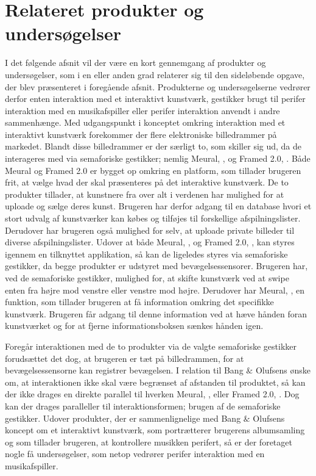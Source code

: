 \section{Relateret produkter og undersøgelser}
\label{RelateretProdukterOgUndersoegelser}
%
I det følgende afsnit vil der være en kort gennemgang af produkter og undersøgelser, som i en eller anden grad relaterer sig til den sideløbende opgave, der blev præsenteret i foregående afsnit. Produkterne og undersøgelserne vedrører derfor enten interaktion med et interaktivt kunstværk, gestikker brugt til perifer interaktion med en musikafspiller eller perifer interaktion anvendt i andre sammenhænge. \blankline
%
Med udgangspunkt i konceptet omkring interaktion med et interaktivt kunstværk forekommer der flere elektroniske billedrammer på markedet. Blandt disse billedrammer er der særligt to, som skiller sig ud, da de interageres med via semaforiske gestikker; nemlig Meural, \parencite{WEB:Meural}, og Framed 2.0, \parencite{WEB:Framed2.0}. Både Meural og Framed 2.0 er bygget op omkring en platform, som tillader brugeren frit, at vælge hvad der skal præsenteres på det interaktive kunstværk. De to produkter tillader, at kunstnere fra over alt i verdenen har mulighed for at uploade og sælge deres kunst. Brugeren har derfor adgang til en database hvori et stort udvalg af kunstværker kan købes og tilføjes til forskellige afspilningslister. Derudover har brugeren også mulighed for selv, at uploade private billeder til diverse afspilningslister. Udover at både Meural, \parencite{WEB:Meural}, og Framed 2.0, \parencite{WEB:Framed2.0}, kan styres igennem en tilknyttet applikation, så kan de ligeledes styres via semaforiske gestikker, da begge produkter er udstyret med bevægelsessensorer. Brugeren har, ved de semaforiske gestikker, mulighed for, at skifte kunstværk ved at swipe enten fra højre mod venstre eller venstre mod højre. Derudover har Meural, \parencite{WEB:Meural}, en funktion, som tillader brugeren at få information omkring det specifikke kunstværk. Brugeren får adgang til denne information ved at hæve hånden foran kunstværket og for at fjerne informationsboksen sænkes hånden igen. 

Foregår interaktionen med de to produkter via de valgte semaforiske gestikker forudsættet det dog, at brugeren er tæt på billedrammen, for at bevægelsessensorne kan registrer bevægelsen. I relation til Bang $\&$ Olufsens ønske om, at interaktionen ikke skal være begrænset af afstanden til produktet, så kan der ikke drages en direkte parallel til hverken Meural, \parencite{WEB:Meural}, eller Framed 2.0, \parencite{WEB:Framed2.0}. Dog kan der drages paralleller til interaktionsformen; brugen af de semaforiske gestikker.\blankline
%
Udover produkter, der er sammenlignelige med Bang $\&$ Olufsens koncept om et interaktivt kunstværk, som portrætterer brugerens albumsamling og som tillader brugeren, at kontrollere musikken perifert, så er der foretaget nogle få undersøgelser, som netop vedrører perifer interaktion med en musikafspiller. 

